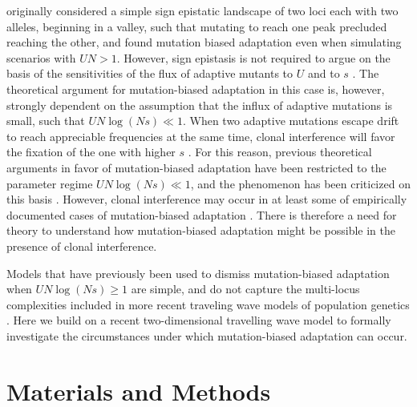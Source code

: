 \documentclass[9pt,twocolumn,twoside]{article}
\begin{document}
\citet{yampolsky2001bias} originally considered a simple sign epistatic landscape of two loci each with two alleles, beginning in a valley, such that mutating to reach one peak precluded reaching the other, and found mutation biased adaptation even when simulating scenarios with $UN>1$. However, sign epistasis is not required to argue on the basis of the sensitivities of the flux of adaptive mutants to $U$ and to $s$ \citep{stoltzfus2019blogPart6}. The theoretical argument for mutation-biased adaptation in this case is, however, strongly dependent on the assumption that the influx of adaptive mutations is small, such that $UN \log(Ns) \ll1$. When two adaptive mutations escape drift to reach appreciable frequencies at the same time, clonal interference will favor the fixation of the one with higher $s$ \citep{Gerrish1998}. For this reason, previous theoretical arguments in favor of mutation-biased adaptation have been restricted to the parameter regime $UN \log(Ns) \ll 1$, and the phenomenon has been criticized on this basis \citep{svensson2019role}. However, clonal interference may occur in at least some of empirically documented cases of mutation-biased adaptation \citep{MacLean2010,miller2011mutational,sackman2017mutation}. There is therefore a need for theory to understand how mutation-biased adaptation might be possible in the presence of clonal interference. 

Models that have previously been used to dismiss mutation-biased adaptation when $UN \log(Ns) \geq 1$ \citep{svensson2019role} are simple, and do not capture the multi-locus complexities included in more recent traveling wave models of population genetics \citep{rouzine2003solitary,desai2007beneficial,park2010speed,hallatschek2011noisy}. Here we build on a recent two-dimensional travelling wave model \citep{gomez2019directional} to formally investigate the circumstances under which mutation-biased adaptation can occur. 

\section{Materials and Methods} \label{sec:materials:methods}
\end{document}
